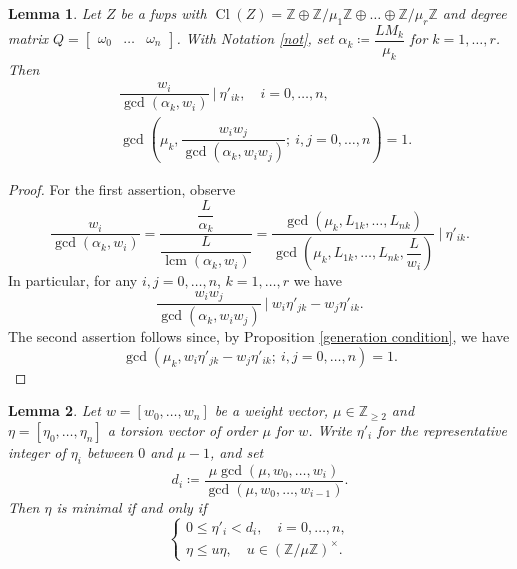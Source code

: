 \documentclass{amsart}
\DeclareMathOperator{\Cl}{Cl}
\DeclareMathOperator{\lcm}{lcm}
\newcommand{\Z}{\mathbb{Z}}
\newtheorem{lem}{Lemma}[section]
\theoremstyle{definition}
\begin{document}
\begin{lem}\label{lem:pairs}
     Let $Z$ be a fwps with $\Cl(Z)=\Z\oplus \Z/\mu_1\Z\oplus\dots\oplus\Z/\mu_r\Z$ and  degree matrix $Q=\begin{bmatrix}
        \omega_0 & \dots & \omega_n
    \end{bmatrix}$. With Notation \ref{not}, set $\alpha_k\coloneqq\dfrac{LM_k}{\mu_k}$ for $k=1,\dots,r$. Then
    \begin{align*}
    &\dfrac{w_i}{\gcd(\alpha_k,w_i)} \ | \ \eta'_{ik}, \quad i=0,\dots,n,\\[3pt]
    &\gcd\left(\mu_k,\dfrac{w_iw_j}{\gcd(\alpha_k,w_iw_j)} ;\ i,j=0,\dots,n\right)=1.
    \end{align*}
\end{lem}

\begin{proof}
    For the first assertion, observe
    $$
    \dfrac{w_i}{\gcd(\alpha_k,w_i)}=\dfrac{\dfrac{L}{\alpha_k}}{\dfrac{L}{\lcm(\alpha_k,w_i)}}=\dfrac{\gcd(\mu_k,L_{1k},\dots,L_{nk})}{\gcd\left(\mu_k,L_{1k},\dots,L_{nk},\dfrac{L}{w_i}\right)}\ |\ \eta'_{ik}.$$
    In particular, for any $i,j=0,\dots,n$, $k=1,\dots,r$ we have
    $$
    \dfrac{w_iw_j}{\gcd(\alpha_k,w_iw_j)}\ | \ w_i\eta'_{jk}-w_j\eta'_{ik}.
    $$
    The second assertion follows since, by Proposition \ref{generation condition}, we have
    $$\gcd(\mu_k,w_i\eta'_{jk}-w_j\eta'_{ik};\ i,j=0,\dots,n)=1.$$
\end{proof}


\begin{lem}\label{lem:lex_min}
    Let $w=[w_0,\dots,w_n]$ be a weight vector, $\mu\in\Z_{\geq 2}$ and $\eta=[\eta_0,\dots,\eta_n]$ a torsion vector of order $\mu$ for $w$. Write $\eta'_i$ for the representative integer of $\eta_i$ between $0$ and $\mu-1$, and set
    $$    d_i\coloneqq\dfrac{\mu\gcd(\mu,w_0,\dots,w_i)}{\gcd(\mu,w_0,\dots,w_{i-1})}.
    $$
    Then $\eta$ is minimal if and only if 
    $$
    \begin{cases}
        0\leq \eta'_i<d_i, \quad i=0,\dots,n,\\
        \eta\leq u\eta, \quad u\in (\Z/\mu\Z)^\times.
    \end{cases}
    $$
\end{lem}
\end{document}
